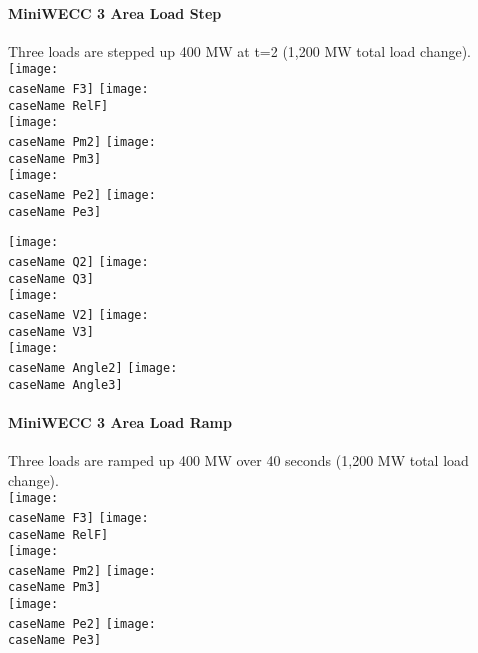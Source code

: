 \documentclass[12pt]{article}
\newcommand{\caseName}{ }
\begin{document}
\renewcommand{\caseName}{miniWECCLTDPSSstep}
\paragraph{MiniWECC 3 Area Load Step} Three loads are stepped up 400 MW at t=2 (1,200 MW total load change).\\

	\texttt{[image: \\caseName F3]} %
	\texttt{[image: \\caseName RelF]} \\

	\texttt{[image: \\caseName Pm2]} %
	\texttt{[image: \\caseName Pm3]} \\

	\texttt{[image: \\caseName Pe2]} %
	\texttt{[image: \\caseName Pe3]} 
	
	\pagebreak

	\texttt{[image: \\caseName Q2]} %
	\texttt{[image: \\caseName Q3]} \\

	\texttt{[image: \\caseName V2]} %
	\texttt{[image: \\caseName V3]} \\

	\texttt{[image: \\caseName Angle2]} %
	\texttt{[image: \\caseName Angle3]} 

\pagebreak
\renewcommand{\caseName}{miniWECCLTDPSSramp}
\paragraph{MiniWECC 3 Area Load Ramp} Three loads are ramped up 400 MW over 40 seconds (1,200 MW total load change).\\

	\texttt{[image: \\caseName F3]} %
	\texttt{[image: \\caseName RelF]} \\

	\texttt{[image: \\caseName Pm2]} %
	\texttt{[image: \\caseName Pm3]} \\

	\texttt{[image: \\caseName Pe2]} %
	\texttt{[image: \\caseName Pe3]} 
	
	\pagebreak
\end{document}
